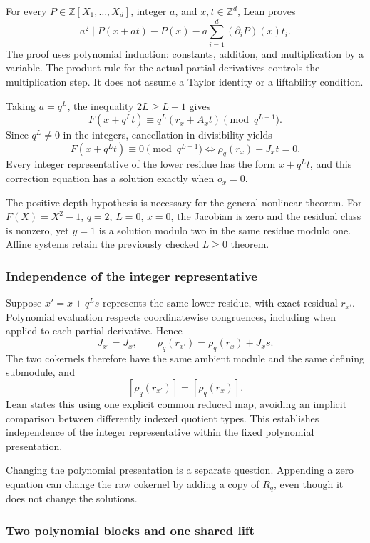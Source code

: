 For every \(P\in\mathbb Z[X_1,\ldots,X_d]\), integer \(a\), and
\(x,t\in\mathbb Z^d\), Lean proves \[
\boxed{
 a^2\mid P(x+at)-P(x)-a\sum_{i=1}^{d}(\partial_iP)(x)t_i.
}
\] The proof uses polynomial induction: constants, addition, and
multiplication by a variable. The product rule for the actual partial
derivatives controls the multiplication step. It does not assume a
Taylor identity or a liftability condition.

Taking \(a=q^L\), the inequality \(2L\ge L+1\) gives \[
F(x+q^Lt)\equiv q^L(r_x+A_xt)\pmod{q^{L+1}}.
\] Since \(q^L\ne0\) in the integers, cancellation in divisibility
yields \[
F(x+q^Lt)\equiv0\pmod{q^{L+1}}
\iff \rho_q(r_x)+J_xt=0.
\] Every integer representative of the lower residue has the form
\(x+q^Lt\), and this correction equation has a solution exactly when
\(o_x=0\).

The positive-depth hypothesis is necessary for the general nonlinear
theorem. For \(F(X)=X^2-1\), \(q=2\), \(L=0\), \(x=0\), the Jacobian is
zero and the residual class is nonzero, yet \(y=1\) is a solution modulo
two in the same residue modulo one. Affine systems retain the previously
checked \(L\ge0\) theorem.

\hypertarget{cont1:independence-of-the-integer-representative}{%
\subsubsection{Independence of the integer
representative}\label{cont1:independence-of-the-integer-representative}}

Suppose \(x'=x+q^Ls\) represents the same lower residue, with exact
residual \(r_{x'}\). Polynomial evaluation respects coordinatewise
congruences, including when applied to each partial derivative. Hence \[
J_{x'}=J_x,
\qquad
\rho_q(r_{x'})=\rho_q(r_x)+J_xs.
\] The two cokernels therefore have the same ambient module and the same
defining submodule, and \[
[\rho_q(r_{x'})]=[\rho_q(r_x)].
\] Lean states this using one explicit common reduced map, avoiding an
implicit comparison between differently indexed quotient types. This
establishes independence of the integer representative within the fixed
polynomial presentation.

Changing the polynomial presentation is a separate question. Appending a
zero equation can change the raw cokernel by adding a copy of \(R_q\),
even though it does not change the solutions.

\hypertarget{cont1:two-polynomial-blocks-and-one-shared-lift}{%
\subsubsection{Two polynomial blocks and one shared
lift}\label{cont1:two-polynomial-blocks-and-one-shared-lift}}

